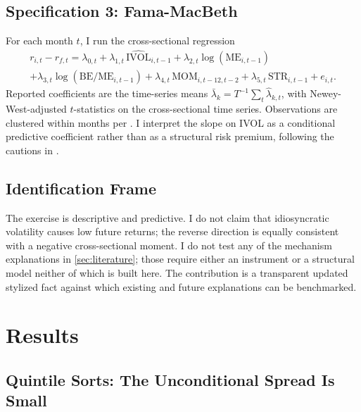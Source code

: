 \documentclass[12pt]{article}
\newcommand{\1}[1]{\mathds{1}\left[#1\right]}
\begin{document}
\subsection{Specification 3: Fama-MacBeth}

For each month $t$, I run the cross-sectional regression
\begin{multline}\label{eq:fm}
r_{i,t} - r_{f,t} = \lambda_{0,t} + \lambda_{1,t}\, \widehat{\mathrm{IVOL}}_{i,t-1}
+ \lambda_{2,t} \log(\mathrm{ME}_{i,t-1}) \\
+ \lambda_{3,t} \log(\mathrm{BE}/\mathrm{ME}_{i,t-1})
+ \lambda_{4,t}\, \mathrm{MOM}_{i,t-12,t-2}
+ \lambda_{5,t}\, \mathrm{STR}_{i,t-1} + e_{i,t}.
\end{multline}
Reported coefficients are the time-series means
$\bar\lambda_k = T^{-1} \sum_t \widehat\lambda_{k,t}$, with Newey-West-adjusted
$t$-statistics on the cross-sectional time series. Observations are clustered
within months per \citet{petersen2009estimating}. I interpret the slope on IVOL
as a conditional predictive coefficient rather than as a structural risk
premium, following the cautions in \citet{jegadeesh2019empirical}.

\subsection{Identification Frame}

The exercise is descriptive and predictive. I do not claim that idiosyncratic
volatility causes low future returns; the reverse direction is equally
consistent with a negative cross-sectional moment. I do not test any of the
mechanism explanations in \cref{sec:literature}; those require either an
instrument or a structural model neither of which is built here. The
contribution is a transparent updated stylized fact against which existing and
future explanations can be benchmarked.

\section{Results}\label{sec:results}

\subsection{Quintile Sorts: The Unconditional Spread Is Small}
\end{document}
